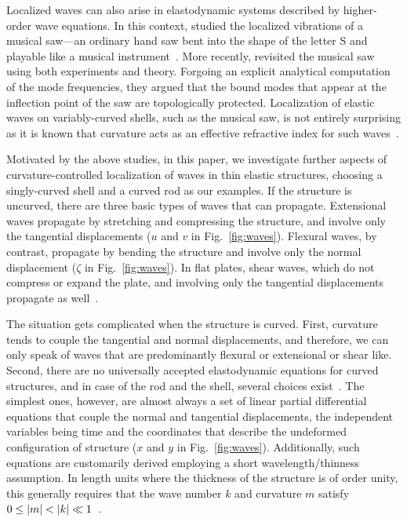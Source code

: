 Localized waves can also arise in elastodynamic systems described by higher-order wave equations.
In this context, \citet{scott1992} studied the localized vibrations of a musical saw---an ordinary hand saw bent into the shape of the letter \textsf{S} and playable like a musical instrument~\cite{leonard1989,stuckenbruck2016}.
More recently, \citet{shankar2022} revisited the musical saw using both experiments and theory.
Forgoing an explicit analytical computation of the mode frequencies, they argued that the bound modes that appear at the inflection point of the saw are topologically protected.
Localization of elastic waves on variably-curved shells, such as the musical saw, is not entirely surprising as it is known that curvature acts as an effective refractive index for such waves~\cite{norris1994,evans2013}.

Motivated by the above studies, in this paper, we investigate further aspects of curvature-controlled localization of waves in thin elastic structures, choosing a singly-curved shell and a curved rod as our examples.
If the structure is uncurved, there are three basic types of waves that can propagate.
Extensional waves propagate by stretching and compressing the structure, and involve only the tangential displacements ($u$ and $v$ in Fig.~\ref{fig:waves}).
Flexural waves, by contrast, propagate by bending the structure and involve only the normal displacement ($\zeta$ in Fig.~\ref{fig:waves}).
In flat plates, shear waves, which do not compress or expand the plate, and involving only the tangential displacements propagate as well~\cite{landau1986}.

The situation gets complicated when the structure is curved.
First, curvature tends to couple the tangential and normal displacements, and therefore, we can only speak of waves that are predominantly flexural or extensional or shear like.
Second, there are no universally accepted elastodynamic equations for curved structures, and in case of the rod and the shell, several choices exist~\cite{morley1961,pierce1993,doyle2021,kernes2021}.
The simplest ones, however, are almost always a set of linear partial differential equations that couple the normal and tangential displacements, the independent variables being time and the coordinates that describe the undeformed configuration of structure ($x$ and $y$ in Fig.~\ref{fig:waves}).
Additionally, such equations are customarily derived employing a short wavelength/thinness assumption.
In length units where the thickness of the structure is of order unity, this generally requires that the wave number $k$ and curvature $m$ satisfy $0 \leq \lvert m\rvert < \lvert k\rvert \ll 1$~\cite{landau1986,pierce1993,pierce1993a,norris1995}.

